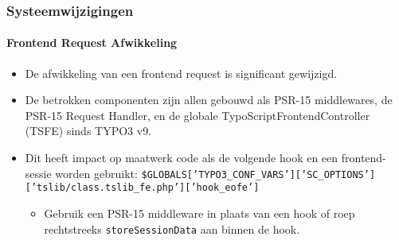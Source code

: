 \begin{frame}[fragile]
	\frametitle{Systeemwijzigingen}
	\framesubtitle{Frontend Request Afwikkeling}

	\lstset{basicstyle=\smaller\ttfamily}

	\begin{itemize}
		\item De afwikkeling van een frontend request is significant gewijzigd.

		\item De betrokken componenten zijn allen gebouwd als PSR-15 middlewares, de PSR-15 Request Handler,
			en de globale TypoScriptFrontendController (TSFE) sinds TYPO3 v9.

		\item Dit heeft impact op maatwerk code als de volgende hook en een frontend-sessie worden gebruikt:\newline
			{\fontsize{7}{8}\selectfont\texttt{\$GLOBALS['TYPO3\_CONF\_VARS']['SC\_OPTIONS']['tslib/class.tslib\_fe.php']['hook\_eofe']}}

			\begin{itemize}\smaller
				\item[\ding{228}] Gebruik een PSR-15 middleware in plaats van een hook of roep rechtstreeks
				\texttt{storeSessionData} aan binnen de hook.
			\end{itemize}\normalsize

	\end{itemize}

\end{frame}



